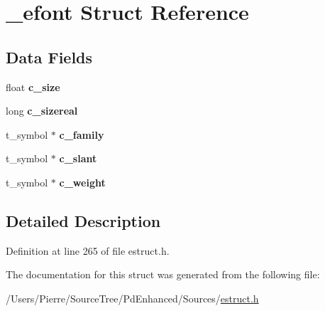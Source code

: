 \hypertarget{struct__efont}{\section{\-\_\-efont Struct Reference}
\label{struct__efont}
}
\subsection*{Data Fields}
\begin{DoxyCompactItemize}
\item 
\hypertarget{struct__efont_a0c2e0d8b2b562976f466b37e1804e896}{float {\bfseries c\-\_\-size}}\label{struct__efont_a0c2e0d8b2b562976f466b37e1804e896}

\item 
\hypertarget{struct__efont_a5067e2808a370660ab2f4b27b52019a5}{long {\bfseries c\-\_\-sizereal}}\label{struct__efont_a5067e2808a370660ab2f4b27b52019a5}

\item 
\hypertarget{struct__efont_ad0a12c28988a03d63f0a63ae52545b7e}{t\-\_\-symbol $\ast$ {\bfseries c\-\_\-family}}\label{struct__efont_ad0a12c28988a03d63f0a63ae52545b7e}

\item 
\hypertarget{struct__efont_afe59dcb9bf09d16691d63350aba4e22f}{t\-\_\-symbol $\ast$ {\bfseries c\-\_\-slant}}\label{struct__efont_afe59dcb9bf09d16691d63350aba4e22f}

\item 
\hypertarget{struct__efont_a1e65976e3fc680a945be671bbcada87c}{t\-\_\-symbol $\ast$ {\bfseries c\-\_\-weight}}\label{struct__efont_a1e65976e3fc680a945be671bbcada87c}

\end{DoxyCompactItemize}


\subsection{Detailed Description}


Definition at line 265 of file estruct.\-h.



The documentation for this struct was generated from the following file\-:\begin{DoxyCompactItemize}
\item 
/\-Users/\-Pierre/\-Source\-Tree/\-Pd\-Enhanced/\-Sources/\hyperlink{estruct_8h}{estruct.\-h}\end{DoxyCompactItemize}
